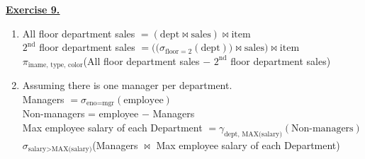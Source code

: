 \documentclass[12pt]{article}
\begin{document}
\newpage
\noindent \hyperlink{toc}{\hypertarget{9}{\LARGE \underline{\textbf{Exercise 9.}}}}
\begin{enumerate}
    \item All floor department sales $=(\text{dept}\Join \text{sales}) \Join \text{item}$\\
          $2^{\text{nd}}$ floor department sales $=\Big(\big(\sigma_{\text{floor}=2}(\text{dept})\big)\Join \text{sales}\Big) \Join \text{item}$\\
          $\pi_{\text{iname, type, color}}$(All floor department sales $-$ $2^{\text{nd}}$ floor department sales)\\[1cm]
    \item  Assuming there is one manager per department.\\
          Managers $= \sigma_{\text{eno}=\text{mgr}}(\text{employee})$\\
          Non-managers = employee $-$ Managers\\
          Max employee salary of each Department $=\gamma_{\text{dept, MAX(salary)}}(\text{Non-managers}) $\\
          $\sigma_{\text{salary}>\text{MAX(salary)}}$(Managers $\Join$ Max employee salary of each Department)\\[1cm]


\end{enumerate}
\end{document}
